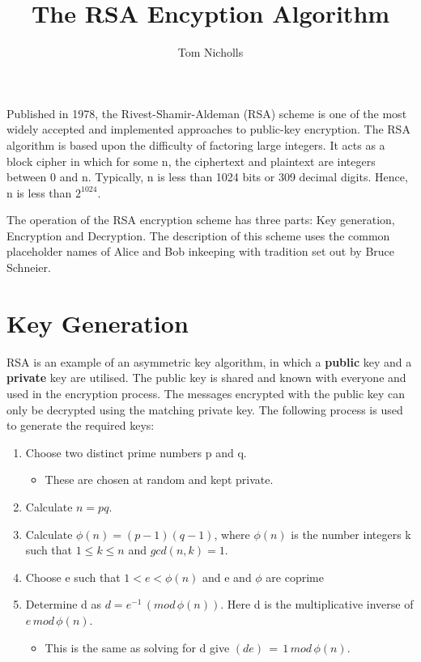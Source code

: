 \documentclass[a4paper,11pt]{article}
\title{The RSA Encyption Algorithm}
\author{Tom Nicholls}
\begin{document}
\maketitle

Published in 1978, the Rivest-Shamir-Aldeman (RSA) scheme is one of the most widely accepted and implemented approaches to public-key encryption. The RSA algorithm is based upon the difficulty of factoring large integers. It acts as a block cipher in which for some n, the ciphertext and plaintext are integers between 0 and n. Typically, n is less than 1024 bits or 309 decimal digits. Hence, n is less than $2^{1024}$.

The operation of the RSA encryption scheme has three parts: Key generation, Encryption and Decryption. The description of this scheme uses the common placeholder names of Alice and Bob inkeeping with tradition set out by Bruce Schneier.

\section{Key Generation}

RSA is an example of an asymmetric key algorithm, in which a \textbf{public} key and a \textbf{private} key are utilised. The public key is shared and known with everyone and used in the encryption process. The messages encrypted with the public key can only be decrypted using the matching private key. The following process is used to generate the required keys:

\begin{enumerate}
  \item Choose two distinct prime numbers p and q.
  \begin{itemize}
    \item These are chosen at random and kept private.
  \end{itemize}
  
  \item Calculate $ n=pq $.
  
  \item Calculate $ \phi (n)=(p-1)(q-1) $, where $ \phi (n) $ is the number integers k such that $ 1 \leq k \leq n $ and $ gcd(n,k) = 1 $.
  
  \item Choose e such that $ 1 < e < \phi (n) $ and e and $ \phi $ are coprime
  
  \item Determine d as $ d = e^{-1} \, (mod \, \phi (n)) $. Here d is the multiplicative inverse of $ e \, mod \, \phi (n) $.
  \begin{itemize}
    \item This is the same as solving for d give $ (de) \, = \, 1 \, mod \, \phi (n) $.
  \end{itemize}
  
\end{enumerate}
\end{document}
